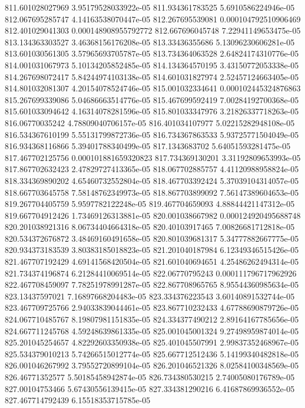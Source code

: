 {811.601028027969 3.95179528033922e-05
811.934361783525 5.6910586224946e-05
812.067695285747 4.14163538070447e-05
812.267695539081 0.000104792510906469
812.401029041303 0.000148908955792772
812.667696045748 7.22941149653475e-05
813.134363303527 3.46368156176208e-05
813.33436355686 5.13096230606281e-05
813.601030561305 3.57965693705787e-05
813.734364063528 2.64824174310776e-05
814.001031067973 5.10134205852485e-05
814.134364570195 3.43150772053338e-05
814.267698072417 5.84244974103138e-05
814.601031827974 2.52457124663405e-05
814.801032081307 4.20154078524746e-05
815.001032334641 0.000102445324876863
815.267699339086 5.04686663514776e-05
815.467699592419 7.00284192700368e-05
815.601033094642 4.16314078281596e-05
815.801033347976 3.21826337718263e-05
816.06770035242 4.78809040706157e-05
816.401034107977 5.02215282948108e-05
816.534367610199 5.55131799872736e-05
816.734367863533 5.93725771504049e-05
816.934368116866 5.39401788340499e-05
817.1343683702 5.64051593281475e-05
817.467702125756 0.000101881659320823
817.734369130201 3.31192809653993e-05
817.867702632423 2.47829727413365e-05
818.067702885757 4.41120988958824e-05
818.334369890202 4.65460732552804e-05
818.467703392424 5.37039104314057e-05
818.667703645758 7.58148762349973e-05
818.867703899092 7.56147389604653e-05
819.267704405759 5.9597782122248e-05
819.467704659093 4.88844421147312e-05
819.667704912426 1.73469126313881e-05
820.001038667982 0.000124920495688748
820.201038921316 8.06734404664318e-05
820.40103917465 7.00826681712818e-05
820.534372676872 3.48469160491658e-05
820.801039681317 5.34777882667775e-05
820.934373183539 3.80383185018823e-05
821.201040187984 6.12349346515426e-05
821.467707192429 4.69141568420504e-05
821.601040694651 4.25486262494314e-05
821.734374196874 6.21284410069514e-05
822.06770795243 0.000111796717962926
822.467708459097 7.78251978991287e-05
822.867708965765 8.95544360985634e-05
823.13437597021 7.16897668204483e-05
823.334376223543 3.60140891532744e-05
823.467709725766 2.94033839044461e-05
823.867710232433 4.67788690879726e-05
824.067710485767 8.19807981151835e-05
824.334377490212 2.89164167785656e-05
824.667711245768 4.59248639861335e-05
825.001045001324 9.27498959874014e-05
825.201045254657 4.82292603350938e-05
825.401045507991 2.99837352468967e-05
825.534379010213 5.74266515012774e-05
825.667712512436 5.14199340482818e-05
826.001046267992 3.79552720899104e-05
826.201046521326 8.02584100348569e-05
826.46771352577 5.50185458942874e-05
826.734380530215 2.74005080176789e-05
827.00104753466 5.67430556139415e-05
827.334381290216 6.41687869936552e-05
827.467714792439 6.15518353715785e-05
}
